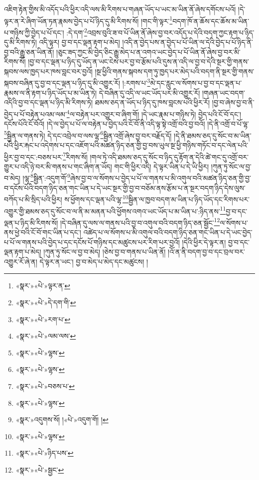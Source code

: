 འཇིག་རྟེན་གྱིས་མི་འདོད་པའི་ཕྱིར་འདི་ལས་མི་རིགས་པ་གཞན་ཡོད་པ་ཡང་མ་ཡིན་ནོ་ཞེས་དགོངས་པའོ། །དེ་ལྟར་ན་རེ་ཞིག་ཡོན་ཏན་རྣམས་བྱེད་པ་པོ་ཉིད་དུ་མི་རིགས་སོ། །གང་གི་ལྟར་\footnote{«སྣར་»«པེ་»ལྟར་ན་}བདག་ཁོ་ན་ཆོས་དང་ཆོས་མ་ཡིན་པ་གཉིས་ཀྱི་བྱེད་པ་པོ་དང་། :དེ་དག་\footnote{«སྣར་»«པེ་»དེ་དག་གི་}འབྲས་བུའི་ཟ་བ་པོ་ཡིན་ནོ་ཞེས་བྱ་བར་འདོད་པ་དེའི་བདག་ཀྱང་རྟག་པ་ཉིད་དུ་མི་རིགས་ཏེ། འདི་ལྟར། བྱ་བ་དང་ལྡན་རྟག་པ་མེད། །འདི་ན་བྱེད་པས་ན་བྱེད་པ་པོ་ཡིན་ལ་དེའི་བྱེད་པ་པོ་ཉིད་ནི་བྱ་བའི་རྒྱུ་ཅན་ཡིན་ནོ། །ཅུང་ཟད་ཀྱང་མི་བྱེད་ཅིང་རྒྱུ་མེད་པ་ན་འགའ་ཡང་བྱེད་པ་པོ་ཡིན་ནོ་ཞེས་བྱ་བར་མི་རིགས་སོ། །བྱ་བ་དང་ལྡན་པ་ཉིད་དུ་ཡོད་ན་ཡང་ངེས་པར་བྱ་བ་རྩོམ་པའི་དུས་ན་འདི་ལ་བྱ་བ་དེའི་སྔར་གྱི་གནས་སྐབས་ལས་ཁྱད་པར་ཁས་བླང་བར་བྱའོ། །སྔ་ཕྱིའི་གནས་སྐབས་དག་ཏུ་ཁྱད་པར་མེད་པའི་བདག་ནི་སྔར་གྱི་གནས་སྐབས་བཞིན་དུ་བྱ་བ་དང་ལྡན་པ་ཉིད་དུ་མི་འགྱུར་རོ། །:རགས་པ་\footnote{«སྣར་»«པེ་»རག་པ་}མེ་དང་རླུང་ལ་སོགས་པ་བྱ་བ་དང་ལྡན་པ་རྣམས་ལ་ནི་རྟག་པ་ཉིད་ཡོད་པ་མ་ཡིན་ཏེ། དེ་བཞིན་དུ་འདི་ལ་ཡང་ཡོད་པར་མི་འགྱུར་རོ། །གཞན་ཡང་བདག་འདིའི་བྱ་བ་དང་ལྡན་པ་ཉིད་མི་རིགས་ཏེ། ཐམས་ཅད་ན་ཡོད་པ་ཉིད་དུ་ཁས་བླངས་པའི་ཕྱིར་རོ། །བྱ་བ་ཞེས་བྱ་བ་ནི་བྱེད་པ་པོ་བརྟེན་པའམ་ལམ་\footnote{«སྣར་»«པེ་»ལམ་ལས་}ལ་བརྟེན་པར་འགྱུར་བ་ཞིག་གོ། །དེ་ཡང་རྣམ་པ་གཉིས་ཏེ། བྱེད་པའི་ངོ་བོ་དང་། དངོས་པོའི་ངོ་བོའོ། །དེ་ལ་བྱེད་པ་པོ་ལ་བརྟེན་པ་བྱེད་པའི་ངོ་བོ་ནི་འདི་ལྟ་སྟེ་འགྲོ་བའི་བྱ་བའོ། །དེ་ནི་འགྲོ་བ་པོ་ལྷ་\footnote{«སྣར་»«པེ་»ལྷས་}སྦྱིན་ལ་གནས་ཏེ། དེ་དང་འབྲེལ་བ་ལས་ལྷ་\footnote{«སྣར་»«པེ་»ལྷས་}སྦྱིན་འགྲོ་ཞེས་བྱ་བར་བརྗོད་དོ། །དེ་ནི་ཐམས་ཅད་དུ་སོང་བ་མ་ཡིན་པའི་ཕྱིར་རྐང་པ་འདེགས་པ་དང་འཇོག་པའི་མཚན་ཉིད་ཅན་གྱི་བྱ་བས་ཡུལ་སྔ་ཕྱི་གཉིས་གཏོང་བ་དང་ལེན་པའི་ཕྱིར་བྱ་བ་དང་:བཅས་པར་\footnote{«སྣར་»«པེ་»བཅས་པ་}རིགས་སོ། །གལ་ཏེ་འདི་ཐམས་ཅད་དུ་སོང་བ་ཉིད་དུ་རྟོག་ན་དེའི་ཚེ་གང་དུ་འགྲོ་བར་གྱུར་པ་འདི་ཉེ་བར་མི་གནས་པ་གང་ཞིག་ན་ཡོད། གང་གི་ཕྱིར་འདི། དེ་ལྟར་ཡིན་པ་དེ་ཡི་ཕྱིར། །ཀུན་ཏུ་སོང་ལ་བྱ་བ་མེད། །ལྷ་\footnote{«སྣར་»«པེ་»ལྷས་}སྦྱིན་:འདུག་གོ་\footnote{«སྣར་»འདུགས་སོ། །«པེ་»འདུག་གོ། །}ཞེས་བྱ་བ་ལ་སོགས་པ་བྱེད་པ་པོ་ལ་གནས་པ་མི་འགུལ་བའི་མཚན་ཉིད་ཅན་གྱི་བྱ་བ་དངོས་པོའི་བདག་ཉིད་ཅན་གང་ཡིན་པ་དེ་ཡང་སྔར་གྱི་བྱ་བ་བཅོམ་ནས་རྩོམ་པ་ན་སྔར་བདག་ཉིད་དེས་ལུས་བཀོད་པ་མི་སྲིད་པའི་ཕྱིར། ས་ཕྱོགས་དང་ལྡན་པའི་ལྷ་\footnote{«སྣར་»«པེ་»ལྷས་}སྦྱིན་ལ་ཁྱབ་བདག་མ་ཡིན་པ་ཉིད་ཡོད་དང་རིགས་པར་འགྱུར་གྱི་ཐམས་ཅད་དུ་སོང་བ་ལ་ནི་མ་མནན་པའི་ཕྱོགས་འགའ་ཡང་ཡོད་པ་མ་ཡིན་པ་:ཉིད་ནས་\footnote{«སྣར་»«པེ་»ཉིད་པས་}བྱ་བ་དང་ལྡན་པ་ཉིད་མི་རིགས་སོ། །དེ་བཞིན་དུ་ལས་ལ་གནས་པའི་བྱ་བ་འགུལ་བའི་བདག་ཉིད་ཅན་སྦྱོང་\footnote{«སྣར་»«པེ་»སྦྱང་}ལ་སོགས་པ་ནས་ཕྱེ་བའི་ངོ་བོ་གང་ཡིན་པ་དང་། འཚེད་པ་ལ་སོགས་པ་མི་འགུལ་བའི་བདག་ཉིད་ཅན་གང་ཡིན་པ་དེ་ཡང་བྱེད་པ་པོ་ལ་གནས་པའི་བྱེད་པ་དང་དངོས་པོ་གཉིས་དང་མཚུངས་པར་རིག་པར་བྱའོ། །དེའི་ཕྱིར་དེ་ལྟར་ན། བྱ་བ་དང་ལྡན་རྟག་པ་མེད། །ཀུན་ཏུ་སོང་ལ་བྱ་བ་མེད། །ཅེས་བྱ་བ་གནས་པ་ཡིན་ནོ། །འོ་ན་ནི་བདག་བྱ་བ་དང་བྲལ་བར་འགྱུར་རོ་ཞེ་ན། དེ་ལྟར་ན་ཡང་། བྱ་བ་མེད་པ་མེད་དང་མཚུངས། །
